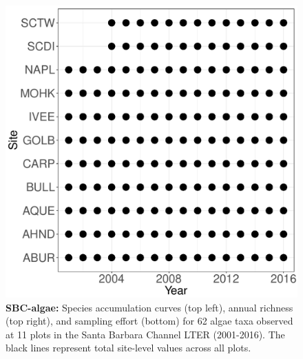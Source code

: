 \documentclass[11pt, oneside]{article}
\begin{document}
\begin{figure}[h!]
\includegraphics[scale = 0.4]{sbc-algae-castorani_spatiotemporal_sampling_effort.pdf}
\caption{{\bf SBC-algae:} Species accumulation curves (top left),  annual richness (top right), and sampling effort (bottom)  for 62 algae taxa observed at 11 plots in the Santa Barbara Channel LTER (2001-2016). The black lines represent total site-level values across all plots.}
\label{sbc-algae}
\end{figure}
\end{document}
